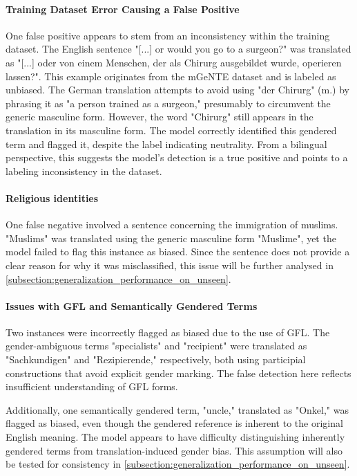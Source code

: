     \paragraph{Training Dataset Error Causing a False Positive}

    One false positive appears to stem from an inconsistency within the training dataset. The English sentence "[...] or would you go to a surgeon?" was translated as "[...] oder von einem Menschen, der als Chirurg ausgebildet wurde, operieren lassen?". This example originates from the mGeNTE dataset and is labeled as unbiased. The German translation attempts to avoid using "der Chirurg" (m.) by phrasing it as "a person trained as a surgeon," presumably to circumvent the generic masculine form. However, the word "Chirurg" still appears in the translation in its masculine form. The model correctly identified this gendered term and flagged it, despite the label indicating neutrality. From a bilingual perspective, this suggests the model’s detection is a true positive and points to a labeling inconsistency in the dataset.

    \paragraph{Religious identities}
    
    One false negative involved a sentence concerning the immigration of muslims. "Muslims" was translated using the generic masculine form "Muslime", yet the model failed to flag this instance as biased. Since the sentence does not provide a clear reason for why it was misclassified, this issue will be further analysed in \autoref{subsection:generalization_performance_on_unseen}.

    \paragraph{Issues with GFL and Semantically Gendered Terms}

    Two instances were incorrectly flagged as biased due to the use of GFL. The gender-ambiguous terms "specialists" and "recipient" were translated as "Sachkundigen" and "Rezipierende," respectively, both using participial constructions that avoid explicit gender marking. The false detection here reflects insufficient understanding of GFL forms.

    Additionally, one semantically gendered term, "uncle," translated as "Onkel," was flagged as biased, even though the gendered reference is inherent to the original English meaning. The model appears to have difficulty distinguishing inherently gendered terms from translation-induced gender bias. This assumption will also be tested for consistency in \autoref{subsection:generalization_performance_on_unseen}.

